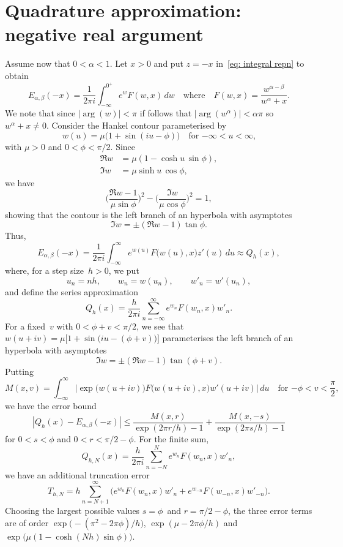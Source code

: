 \documentclass[12pt,a4paper]{article}
\begin{document}
\section{Quadrature approximation: negative real argument}\label{sec: quad neg}
Assume now that $0<\alpha<1$. Let $x>0$ and put $z=-x$ 
in~\eqref{eq: integral repn} to obtain
\[
E_{\alpha,\beta}(-x)=\frac{1}{2\pi i}\int_{-\infty}^{0^+}
    e^wF(w,x)\,dw
\quad\text{where}\quad
F(w,x)=\frac{w^{\alpha-\beta}}{w^\alpha+x}.
\]
We note that since $|\arg(w)|<\pi$ if follows that $|\arg(w^\alpha)|<\alpha\pi$
so $w^\alpha+x\ne0$.  Consider the Hankel contour parameterised 
by~\cite{WeidemanTrefethen2007}
\[
w(u)=\mu\bigl(1+\sin(iu-\phi)\bigr)\quad\text{for $-\infty<u<\infty$,}
\]
with $\mu>0$ and $0<\phi<\pi/2$. Since
\begin{align*}
\Re w&=\mu(1-\cosh u\,\sin\phi),\\
\Im w&=\mu\sinh u\,\cos\phi,
\end{align*}
we have
\[
\biggl(\frac{\Re w-1}{\mu\sin\phi}\biggr)^2
    -\biggl(\frac{\Im w}{\mu\cos\phi}\biggr)^2=1,
\]
showing that the contour is the left branch of an hyperbola with asymptotes
\[
\Im w=\pm(\Re w-1)\tan\phi.
\]
Thus,
\[
E_{\alpha,\beta}(-x)=\frac{1}{2\pi i}\int_{-\infty}^\infty 
e^{w(u)}F\bigl(w(u),x\bigr)z'(u)\,du\approx Q_h(x),
\]
where, for a step size~$h>0$, we put
\[
u_n=nh,\qquad w_n=w(u_n),\qquad w'_n=w'(u_n),
\]
and define the series approximation
\[
Q_h(x)=\frac{h}{2\pi i}\sum_{n=-\infty}^\infty e^{w_n}F(w_n,x)w'_n.
\]
For a fixed~$v$ with $0<\phi+v<\pi/2$, we see that
$w(u+iv)=\mu\bigl[1+\sin(iu-(\phi+v)\bigr)\bigr]$ parameterises the left 
branch of an hyperbola with asymptotes
\[
\Im w=\pm(\Re w-1)\tan(\phi+v).
\]
Putting
\[
M(x,v)=\int_{-\infty}^\infty\bigl|\exp\bigl(w(u+iv)\bigr)
    F\bigl(w(u+iv),x\bigr)w'(u+iv)\bigr|\,du
    \quad\text{for $-\phi<v<\frac{\pi}{2}$,}
\]
we have the error bound~\cite[Theorem~2.1]{WeidemanTrefethen2007}
\[
|Q_h(x)-E_{\alpha,\beta}(-x)|\le\frac{M(x,r)}{\exp(2\pi r/h)-1}
    +\frac{M(x,-s)}{\exp(2\pi s/h)-1}
\]
for $0<s<\phi$ and $0<r<\pi/2-\phi$.  For the finite sum,
\begin{equation}\label{eq: Q_hN}
Q_{h,N}(x)=\frac{h}{2\pi i}\sum_{n=-N}^N e^{w_n}F(w_n,x)w'_n,
\end{equation}
we have an additional truncation error
\[
T_{h,N}=h\sum_{n=N+1}^\infty\bigl(e^{w_n}F(w_n,x)w'_n
    +e^{w_{-n}}F(w_{-n},x)w'_{-n}\bigr).
\]
Choosing the largest possible values $s=\phi$~and $r=\pi/2-\phi$, the three
error terms are of order $\exp\bigl(-(\pi^2-2\pi\phi)/h\bigr)$,
$\exp(\mu-2\pi\phi/h)$ and $\exp\bigl(\mu(1-\cosh(Nh)\sin\phi)\bigr)$.
\end{document}
